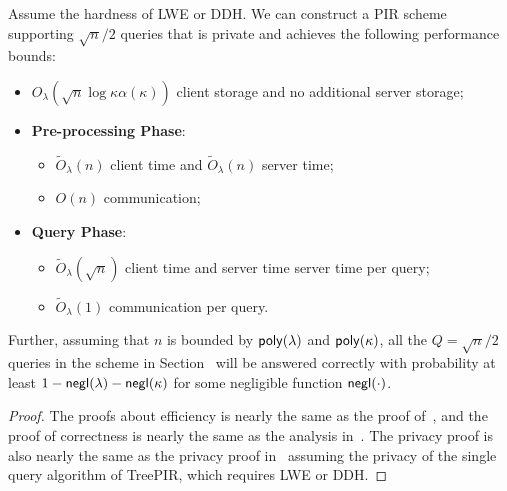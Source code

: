 

\begin{theorem}
    Assume the hardness of LWE or DDH. We can construct a PIR scheme supporting $\sqrt{n}/2$ queries that is private and achieves the following performance bounds:
    \begin{itemize}
        \item $O_\lambda(\sqrt{n}\log \kappa \alpha(\kappa))$ client storage and no additional server storage;
        \item \textbf{Pre-processing Phase}:
        \begin{itemize}
            \item $\widetilde{O}_\lambda(n)$ client time and $\widetilde{O}_\lambda(n)$ server time;
            \item $O(n)$ communication;
        \end{itemize}
        \item \textbf{Query Phase}:
        \begin{itemize}
            \item $\widetilde{O}_\lambda(\sqrt{n})$ client time and server time server time per query; 
            \item $\widetilde{O}_\lambda(1)$ communication per query.
        \end{itemize}
    \end{itemize} 
    Further, assuming that $n$ is bounded by $\mathsf{poly}(\lambda)$ and $\mathsf{poly}(\kappa)$, all the $Q= \sqrt{n}/2$ queries in the scheme in Section~ will be answered correctly with probability at least $1-\mathsf{negl}(\lambda)-\mathsf{negl}(\kappa)$ for some negligible function $\mathsf{negl}(\cdot)$.
\end{theorem}

\begin{proof}
    The proofs about efficiency is nearly the same as the proof of~, and the proof of correctness is nearly the same as the analysis in~.
    The privacy proof is also nearly the same as the privacy proof in~ assuming the privacy of the single query algorithm of TreePIR, which requires LWE or DDH.
\end{proof}




